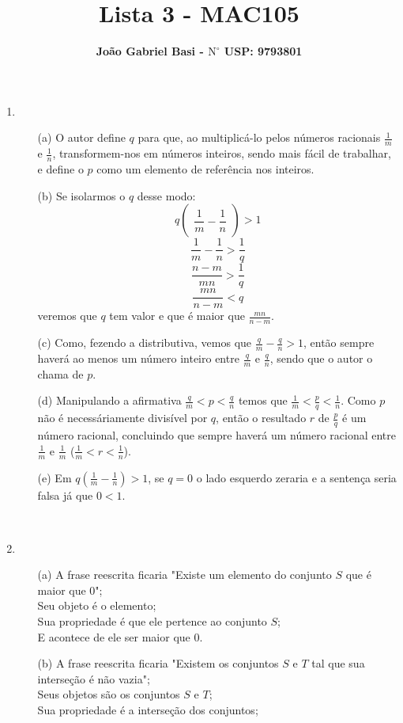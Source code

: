 \documentclass[12pt, a4paper]{article} %
\title{ \textbf{Lista 3 - MAC105}}
\date{}
\author{ \textbf{João Gabriel Basi - $\text{N}^\circ$ USP: 9793801}}
\begin{document}
\maketitle
\begin{enumerate}
\item
\begin{enumerate}
\item[(a)] O autor define $q$ para que, ao multiplicá-lo pelos números racionais $\frac{1}{m}$ e $\frac{1}{n}$, transformem-nos em números inteiros, sendo mais fácil de trabalhar, e define o $p$ como um elemento de referência nos inteiros.
\item[(b)] Se isolarmos o $q$ desse modo:
$$q \begin{pmatrix} \dfrac{1}{m}-\dfrac{1}{n} \end{pmatrix} >1$$
$$\frac{1}{m}-\frac{1}{n}>\frac{1}{q}$$
$$\frac{n-m}{mn}>\frac{1}{q}$$
$$\frac{mn}{n-m}<q$$
veremos que $q$ tem valor e que é maior que $\frac{mn}{n-m}$.
\item[(c)] Como, fezendo a distributiva, vemos que $\frac{q}{m}-\frac{q}{n}>1$, então sempre haverá ao menos um número inteiro entre $\frac{q}{m}$ e $\frac{q}{n}$, sendo que o autor o chama de $p$.
\item[(d)] Manipulando a afirmativa $\frac{q}{m}<p<\frac{q}{n}$ temos que $\frac{1}{m}<\frac{p}{q}<\frac{1}{n}$. Como $p$ não é necessáriamente divisível por $q$, então o resultado $r$ de $\frac{p}{q}$ é um número racional, concluindo que sempre haverá um número racional entre $\frac{1}{m}$ e $\frac{1}{m}$ ($\frac{1}{m}<r<\frac{1}{n}$).
\item[(e)] Em $q(\frac{1}{m}-\frac{1}{n})>1$, se $q=0$ o lado esquerdo zeraria e a sentença seria falsa já que $0<1$.
\end{enumerate}
~
\item
\begin{enumerate}
\item[(a)] A frase reescrita ficaria "Existe um elemento do conjunto $S$ que é maior que 0";\\
Seu objeto é o elemento; \\
Sua propriedade é que ele pertence ao conjunto $S$; \\
E acontece de ele ser maior que 0.
\item[(b)] A frase reescrita ficaria "Existem os conjuntos $S$ e $T$ tal que sua interseção é não vazia";\\
Seus objetos são os conjuntos $S$ e $T$; \\
Sua propriedade é a interseção dos conjuntos; \\

\end{enumerate}
\end{enumerate}
\end{document}
